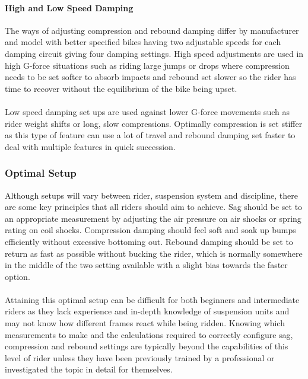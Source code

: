 	\paragraph{High and Low Speed Damping} 
		The ways of adjusting compression and rebound damping differ by manufacturer and model with better specified bikes having two adjustable speeds for each damping circuit giving four damping settings. High speed adjustments are used in high G-force situations such as riding large jumps or drops where compression needs to be set softer to absorb impacts and rebound set slower so the rider has time to recover without the equilibrium of the bike being upset.
		\\\\
		Low speed damping set ups are used against lower G-force movements such as rider weight shifts or long, slow compressions. Optimally compression is set stiffer as this type of feature can use a lot of travel and rebound damping set faster to deal with multiple features in quick succession.
	\subsubsection{Optimal Setup}
		Although setups will vary between rider, suspension system and discipline, there are some key principles that all riders should aim to achieve. Sag should be set to an appropriate measurement by adjusting the air pressure on air shocks or spring rating on coil shocks. Compression damping should feel soft and soak up bumps efficiently without excessive bottoming out. Rebound damping should be set to return as fast as possible without bucking the rider, which is normally somewhere in the middle of the two setting available with a slight bias towards the faster option.
		\\\\
		Attaining this optimal setup can be difficult for both beginners and intermediate riders as they lack experience and in-depth knowledge of suspension units and may not know how different frames react while being ridden. Knowing which measurements to make and the calculations required to correctly configure sag, compression and rebound settings are typically beyond the capabilities of this level of rider unless they have been previously trained by a professional or investigated the topic in detail for themselves.